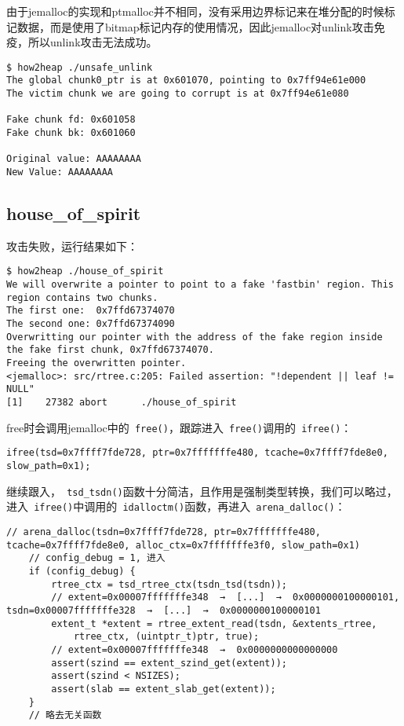 由于jemalloc的实现和ptmalloc并不相同，没有采用边界标记来在堆分配的时候标记数据，而是使用了bitmap标记内存的使用情况，因此jemalloc对unlink攻击免疫，所以unlink攻击无法成功。
\begin{verbatim}
$ how2heap ./unsafe_unlink
The global chunk0_ptr is at 0x601070, pointing to 0x7ff94e61e000
The victim chunk we are going to corrupt is at 0x7ff94e61e080

Fake chunk fd: 0x601058
Fake chunk bk: 0x601060

Original value: AAAAAAAA
New Value: AAAAAAAA

\end{verbatim}

\subsection{house\_of\_spirit}

攻击失败，运行结果如下：
\begin{verbatim}
$ how2heap ./house_of_spirit
We will overwrite a pointer to point to a fake 'fastbin' region. This region contains two chunks.
The first one:  0x7ffd67374070
The second one: 0x7ffd67374090
Overwritting our pointer with the address of the fake region inside the fake first chunk, 0x7ffd67374070.
Freeing the overwritten pointer.
<jemalloc>: src/rtree.c:205: Failed assertion: "!dependent || leaf != NULL"
[1]    27382 abort      ./house_of_spirit

\end{verbatim}

free时会调用jemalloc中的\verb+ free()+，跟踪进入\verb+ free()+调用的\verb+ ifree()+：
\begin{verbatim}
ifree(tsd=0x7ffff7fde728, ptr=0x7fffffffe480, tcache=0x7ffff7fde8e0, slow_path=0x1);
\end{verbatim}

继续跟入，\verb+ tsd_tsdn()+函数十分简洁，且作用是强制类型转换，我们可以略过，进入\verb+ ifree()+中调用的\verb+ idalloctm()+函数，再进入\verb+ arena_dalloc()+：
\begin{verbatim}
// arena_dalloc(tsdn=0x7ffff7fde728, ptr=0x7fffffffe480, tcache=0x7ffff7fde8e0, alloc_ctx=0x7fffffffe3f0, slow_path=0x1)
    // config_debug = 1, 进入
    if (config_debug) {
        rtree_ctx = tsd_rtree_ctx(tsdn_tsd(tsdn));
        // extent=0x00007fffffffe348  →  [...]  →  0x0000000100000101, tsdn=0x00007fffffffe328  →  [...]  →  0x0000000100000101
        extent_t *extent = rtree_extent_read(tsdn, &extents_rtree,
            rtree_ctx, (uintptr_t)ptr, true);
        // extent=0x00007fffffffe348  →  0x0000000000000000
        assert(szind == extent_szind_get(extent));
        assert(szind < NSIZES);
        assert(slab == extent_slab_get(extent));
    }
    // 略去无关函数
\end{verbatim}

